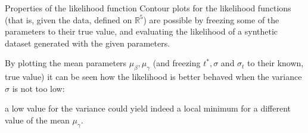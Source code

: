 \documentclass{beamer}
\begin{document}
\begin{frame}{Properties of the likelihood function}
  Contour plots for the likelihood functions (that is, given the data, defined on \(\mathbb{R}^5\)) are possible by freezing some of the parameters to their true value,
  and evaluating the likelihood of a synthetic dataset generated with the given parameters.

  By plotting the mean parameters \(\mu_\beta, \mu_\gamma\) (and freezing \(t^*, \sigma\) and \(\sigma_t\) to their known, true value) it can be seen how the likelihood is better behaved when the variance \(\sigma\) is not too low:

  a low value for the variance could yield indeed a local minimum for a different value of the mean \(\mu_\gamma\).
  
\end{frame}
\end{document}
